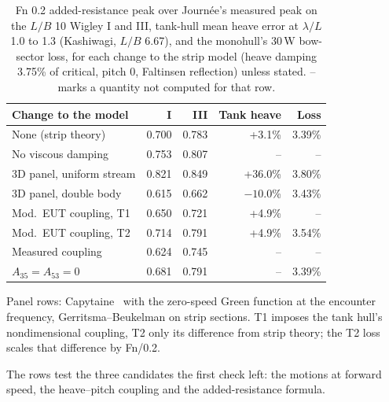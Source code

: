 \documentclass[conference]{IEEEtran}
\begin{document}
\begin{table}[t]
\centering
\caption{Fn 0.2 added-resistance peak over Journ\'ee's measured peak on the $L/B$ 10 Wigley I and III, tank-hull mean heave error at $\lambda/L$ 1.0 to 1.3 (Kashiwagi, $L/B$ 6.67), and the monohull's 30\,W bow-sector loss, for each change to the strip model (heave damping 3.75\% of critical, pitch 0, Faltinsen reflection) unless stated. -- marks a quantity not computed for that row.}
\label{tab:lb10}
\small
\begin{tabular}{@{}lrrrr@{}}
\toprule
Change to the model & I & III & Tank heave & Loss \\
\midrule
None (strip theory) & 0.700 & 0.783 & +3.1\% & 3.39\% \\
No viscous damping & 0.753 & 0.807 & -- & -- \\
3D panel, uniform stream & 0.821 & 0.849 & +36.0\% & 3.80\% \\
3D panel, double body & 0.615 & 0.662 & $-10.0$\% & 3.43\% \\
Mod.\ EUT coupling, T1 & 0.650 & 0.721 & +4.9\% & -- \\
Mod.\ EUT coupling, T2 & 0.714 & 0.791 & +4.9\% & 3.54\% \\
Measured coupling & 0.624 & 0.745 & -- & -- \\
$A_{35}{=}A_{53}{=}0$ & 0.681 & 0.791 & -- & 3.39\% \\
\bottomrule
\end{tabular}

\smallskip
{\footnotesize Panel rows: Capytaine~\cite{ancellin2019capytaine} with the zero-speed Green function at the encounter frequency, Gerritsma--Beukelman on strip sections. T1 imposes the tank hull's nondimensional coupling, T2 only its difference from strip theory; the T2 loss scales that difference by Fn/0.2.}
\end{table}

The rows test the three candidates the first check left: the motions at forward speed, the heave--pitch coupling and the added-resistance formula.
\end{document}
